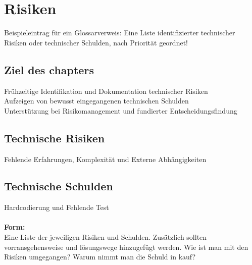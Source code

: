 \chapter{Risiken}

Beispieleintrag für ein Glossarverweis: %
Eine Liste identifizierter technischer Risiken oder technischer Schulden, nach Priorität geordnet!
\\
\section{Ziel des chapters}
Frühzeitige Identifikation und Dokumentation technischer Risiken\\
Aufzeigen von bewusst eingegangenen technischen Schulden\\
Unterstützung bei Risikomanagement und fundierter Entscheidungsfindung\\

\section{Technische Risiken}
Fehlende Erfahrungen, Komplexität und Externe Abhängigkeiten



\section{Technische Schulden}
Hardcodierung und Fehlende Test\\\\
\textbf{Form:}\\
Eine Liste der jeweiligen Risiken und Schulden. 
Zusätzlich sollten vorransgehensweise und lösungswege hinzugefügt werden.
Wie ist man mit den Risiken umgegangen?
Warum nimmt man die Schuld in kauf?
